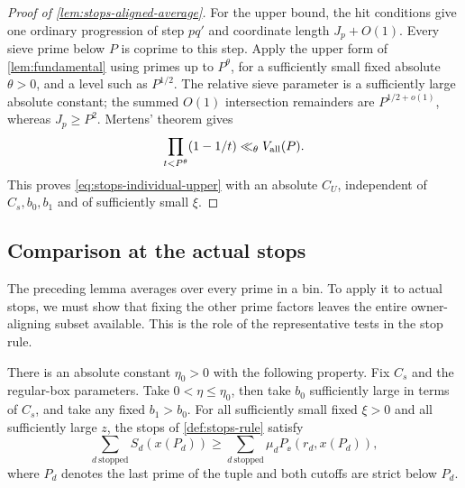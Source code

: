 \begin{proof}[Proof of \cref{lem:stops-aligned-average}]
For the upper bound, the hit conditions give one ordinary progression
of step $pq'$ and coordinate length $J_p+O(1)$.
Every sieve prime below $P$ is
coprime to this step.  Apply the upper form of
\cref{lem:fundamental} using primes up to $P^\theta$, for a
sufficiently small fixed absolute $\theta>0$, and a level such as
$P^{1/2}$.  The relative sieve parameter is a sufficiently large
absolute constant; the summed $O(1)$ intersection remainders are
$P^{1/2+o(1)}$, whereas $J_p\ge P^2$.  Mertens' theorem gives
\[
 \prod_{t<P^\theta}(1-1/t)\ll_\theta V_{\rm all}(P).
\]
This proves \eqref{eq:stops-individual-upper} with an absolute
$C_U$, independent of $C_s,b_0,b_1$ and of sufficiently small $\xi$.

\end{proof}

\subsection{Comparison at the actual stops}

The preceding lemma averages over every prime in a bin.  To apply it
to actual stops, we must show that fixing the other prime factors
leaves the entire owner-aligning subset available.  This is the role
of the representative tests in the stop rule.

\begin{proposition}
\label{prop:stopped-comparison}
There is an absolute constant $\eta_0>0$ with the following property.
Fix $C_s$ and the regular-box parameters.  Take $0<\eta\le\eta_0$,
then take $b_0$ sufficiently large in terms of $C_s$, and take any
fixed $b_1>b_0$.  For all sufficiently small fixed $\xi>0$ and all
sufficiently large $z$, the stops of \cref{def:stops-rule} satisfy
\begin{equation}\label{eq:stops-comparison}
 \sum_{d\ \mathrm{stopped}} S_d(x(P_d))
 \ge
 \sum_{d\ \mathrm{stopped}}\mu_d P_\ee(r_d,x(P_d)),
\end{equation}
where $P_d$ denotes the last prime of the tuple and both cutoffs are
strict below $P_d$.
\end{proposition}

